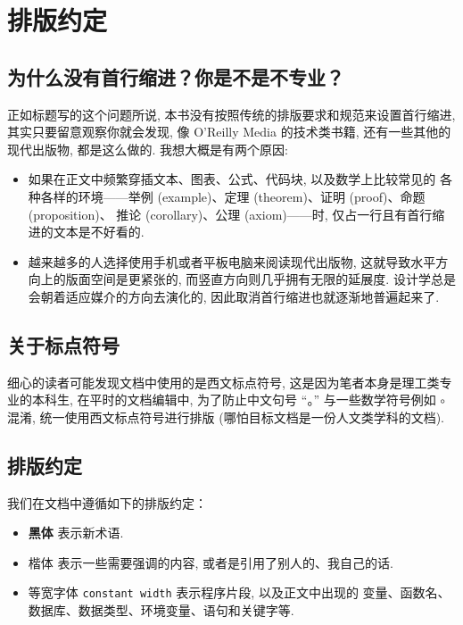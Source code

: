 \section*{排版约定}

\subsection*{为什么没有首行缩进？你是不是不专业？}

正如标题写的这个问题所说, 本书没有按照传统的排版要求和规范来设置首行缩进, 
其实只要留意观察你就会发现, 像 O'Reilly Media 的技术类书籍, 
还有一些其他的现代出版物, 都是这么做的. 
我想大概是有两个原因:
\begin{itemize}
    \item 如果在正文中频繁穿插文本、图表、公式、代码块, 以及数学上比较常见的
    各种各样的环境——举例 (example)、定理 (theorem)、证明 (proof)、命题 (proposition)、
    推论 (corollary)、公理 (axiom)——时, 仅占一行且有首行缩进的文本是不好看的.
    \item 越来越多的人选择使用手机或者平板电脑来阅读现代出版物, 
    这就导致水平方向上的版面空间是更紧张的, 而竖直方向则几乎拥有无限的延展度. 
    设计学总是会朝着适应媒介的方向去演化的, 因此取消首行缩进也就逐渐地普遍起来了. 
\end{itemize}

\subsection*{关于标点符号}

细心的读者可能发现文档中使用的是西文标点符号, 这是因为笔者本身是理工类专业的本科生,
在平时的文档编辑中, 为了防止中文句号 “。” 与一些数学符号例如 $\circ$ 混淆,
统一使用西文标点符号进行排版 (哪怕目标文档是一份人文类学科的文档).

\subsection*{排版约定}

我们在文档中遵循如下的排版约定：
\begin{itemize}
    \item {\bfseries 黑体} 表示新术语. 
    \item {\kaishu 楷体} 表示一些需要强调的内容, 或者是引用了别人的、我自己的话. 
    \item 等宽字体 \lstinline|constant width| 表示程序片段, 以及正文中出现的
    变量、函数名、数据库、数据类型、环境变量、语句和关键字等. 
\end{itemize}

